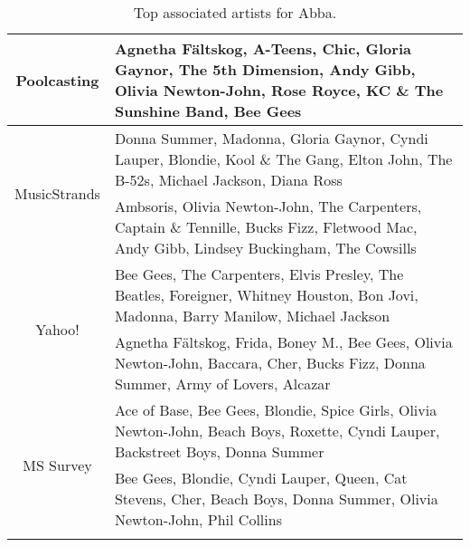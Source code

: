 \begin{table}[bhtp]\centering
\setlength{\extrarowheight}{3pt}
\setlength{\abovecaptionskip}{3pt}
\setlength{\belowcaptionskip}{3pt}
\setlength{\intextsep}{0pt}
\caption{Top associated artists for Abba.}\label{table:samplerelevance6}
{\fontsize{8}{10}\selectfont
\begin{tabular}{|c|p{}|}
 \hline 
 \multirow{2}{*}{Poolcasting} &
 Agnetha F\"{a}ltskog, A-Teens, Chic, Gloria Gaynor, The 5th Dimension, Andy Gibb, Olivia Newton-John, Rose Royce, KC \& The Sunshine Band, Bee Gees \vspace{2pt} \\
 \hline
 \multirow{2}{*}{MusicStrands} &
 Donna Summer, Madonna, Gloria Gaynor, Cyndi Lauper, Blondie, Kool \& The Gang, Elton John, The B-52s, Michael Jackson, Diana Ross \vspace{2pt} \\
 \hline
 \multirow{2}{*}{AllMusic} &
 Ambsoris, Olivia Newton-John, The Carpenters, Captain \& Tennille, Bucks Fizz, Fletwood Mac, Andy Gibb, Lindsey Buckingham, The Cowsills \vspace{2pt} \\
 \hline
 \multirow{2}{*}{Yahoo!} &
 Bee Gees, The Carpenters, Elvis Presley, The Beatles, Foreigner, Whitney Houston, Bon Jovi, Madonna, Barry Manilow, Michael Jackson \vspace{2pt} \\
 \hline
 \multirow{2}{*}{Last.fm} &
 Agnetha F\"{a}ltskog, Frida, Boney M., Bee Gees, Olivia Newton-John, Baccara, Cher, Bucks Fizz, Donna Summer, Army of Lovers, Alcazar \vspace{2pt} \\
 \hline
 \multirow{2}{*}{MS Survey} &
 Ace of Base, Bee Gees, Blondie, Spice Girls, Olivia Newton-John, Beach Boys, Roxette, Cyndi Lauper, Backstreet Boys, Donna Summer \vspace{2pt} \\
 \hline
 \multirow{2}{*}{MS Playlists} &
 Bee Gees, Blondie, Cyndi Lauper, Queen, Cat Stevens, Cher, Beach Boys, Donna Summer, Olivia Newton-John, Phil Collins \vspace{2pt} \\
 \hline
 \noalign{\bigskip}
\end{tabular}}
\end{table}
%
